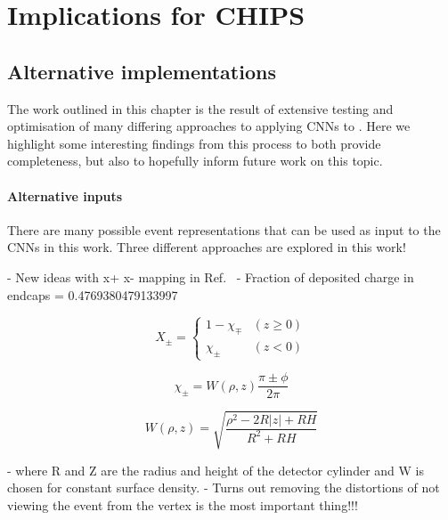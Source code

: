 \chapter{Implications for CHIPS}
\label{chap:implications}

\section{Alternative implementations} %
\label{sec:cvn_alt} %

The work outlined in this chapter is the result of extensive testing and optimisation of many
differing approaches to applying CNNs to \chips. Here we highlight some interesting findings from
this process to both provide completeness, but also to hopefully inform future work on this topic.

\subsubsection*{Alternative inputs} %

There are many possible event representations that can be used as input to the CNNs in this work.
Three different approaches are explored in this work!

- New ideas with x+ x- mapping in Ref.~\cite{berns2020}
- Fraction of deposited charge in endcaps = 0.4769380479133997

\begin{equation} %
    X_{\pm}=
    \begin{cases}
        1-\chi_{\mp} & (z \geq 0) \\
        \chi_{\pm}   & (z < 0)
    \end{cases}
    \label{eq:iso_case}
\end{equation}

\begin{equation} %
    \chi_{\pm}=W(\rho,z)\frac{\pi\pm\phi}{2\pi}
    \label{eq:iso_main}
\end{equation}

\begin{equation} %
    W(\rho,z)=\sqrt{\frac{\rho^{2}-2R|z|+RH}{R^{2}+RH}}
    \label{eq:iso_part}
\end{equation}

- where R and Z are the radius and height of the detector cylinder and W is chosen for constant
surface density.
- Turns out removing the distortions of not viewing the event from the vertex is the most
important thing!!!

